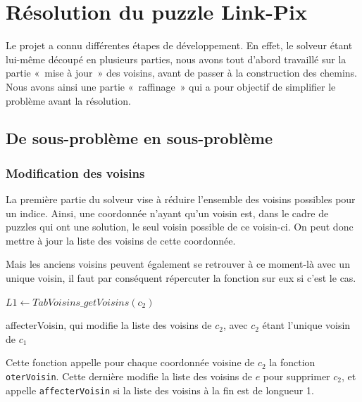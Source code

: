 \chapter{Résolution du puzzle Link-Pix}

Le projet a connu différentes étapes de développement. En effet, le solveur étant lui-même découpé en plusieurs parties, nous avons tout d'abord travaillé sur la partie «~mise à jour~» des voisins, avant de passer à la construction des chemins. Nous avons ainsi une partie «~raffinage~» qui a pour objectif de simplifier le problème avant la résolution.

\section{De sous-problème en sous-problème}

\subsection{Modification des voisins}

La première partie du solveur vise à réduire l'ensemble des voisins possibles pour un indice. Ainsi, une coordonnée n'ayant qu'un voisin est, dans le cadre de puzzles qui ont une solution, le seul voisin possible de ce voisin-ci. On peut donc mettre à jour la liste des voisins de cette coordonnée.

Mais les anciens voisins peuvent également se retrouver à ce moment-là avec un unique voisin, il faut par conséquent répercuter la fonction sur eux si c'est le cas.

\begin{algorithm}
$L1 \gets TabVoisins\_getVoisins(c_2)$ \;
\caption{affecterVoisin, qui modifie la liste des voisins de $c_2$, avec $c_2$ étant l'unique voisin de $c_1$}
\end{algorithm}

Cette fonction appelle pour chaque coordonnée voisine de $c_2$ la fonction \verb$oterVoisin$. Cette dernière modifie la liste des voisins de $e$ pour supprimer $c_2$, et appelle \verb$affecterVoisin$ si la liste des voisins à la fin est de longueur 1.

